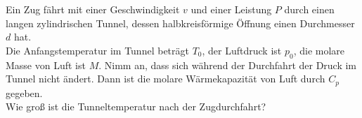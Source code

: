 \begin{Exercise}[title = Tunnel, origin = {EstPhO 2009}, difficulty = 3, label = train]
	Ein Zug fährt mit einer Geschwindigkeit $v$ und einer Leistung $P$ durch einen langen zylindrischen Tunnel, dessen halbkreisförmige Öffnung einen Durchmesser $d$ hat.\\
	Die Anfangstemperatur im Tunnel beträgt $T_0$, der Luftdruck ist $p_0$, die molare Masse von Luft ist $M$. Nimm an, dass sich während der Durchfahrt der Druck im Tunnel nicht ändert. Dann ist die molare Wärmekapazität von Luft durch $C_p$ gegeben.\\
	Wie groß ist die Tunneltemperatur nach der Zugdurchfahrt?
\end{Exercise}